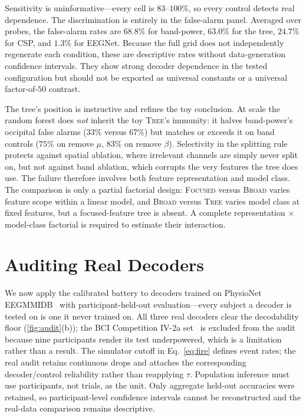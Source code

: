 \documentclass[manuscript,nonacm]{acmart}
\begin{document}
Sensitivity is uninformative---every cell is $83$--$100\%$, so every control detects
real dependence. The discrimination is entirely in the false-alarm panel. Averaged over
probes, the false-alarm rates are $68.8\%$ for band-power, $63.0\%$ for the tree,
$24.7\%$ for CSP, and $1.3\%$ for EEGNet. Because the full grid does not independently
regenerate each condition, these are descriptive rates without data-generation confidence
intervals. They show strong decoder dependence in the tested configuration but should not
be exported as universal constants or a universal factor-of-$50$ contrast.

The tree's position is instructive and refines the toy conclusion. At scale the random
forest does \emph{not} inherit the toy \textsc{Tree}'s immunity: it halves band-power's
occipital false alarms ($33\%$ versus $67\%$) but matches or exceeds it on band controls
($75\%$ on remove $\mu$, $83\%$ on remove $\beta$). Selectivity in the splitting rule
protects against spatial ablation, where irrelevant channels are simply never split on,
but not against band ablation, which corrupts the very features the tree does use. The
failure therefore involves both feature representation and model class. The comparison
is only a partial factorial design: \textsc{Focused} versus \textsc{Broad} varies feature
scope within a linear model, and \textsc{Broad} versus \textsc{Tree} varies model class
at fixed features, but a focused-feature tree is absent. A complete representation
$\times$ model-class factorial is required to estimate their interaction.

\section{Auditing Real Decoders}
We now apply the calibrated battery to decoders trained on PhysioNet
EEGMMIDB~\cite{schalk2004physionet,goldberger2000physiobank} with participant-held-out
evaluation---every subject a decoder is tested on is one it never trained on. All three
real decoders clear the decodability floor (\cref{fig:audit}(b)); the BCI Competition
IV-2a set~\cite{tangermann2012bci} is excluded from the audit because nine participants
render its test underpowered, which is a limitation rather than a result.
The simulator cutoff in Eq.~\eqref{eq:fire} defines event rates; the real audit retains
continuous drops and attaches the corresponding decoder/control reliability rather than
reapplying $\tau$. Population inference must use participants, not trials, as the unit.
Only aggregate held-out accuracies were retained, so participant-level confidence
intervals cannot be reconstructed and the real-data comparison remains descriptive.
\end{document}
